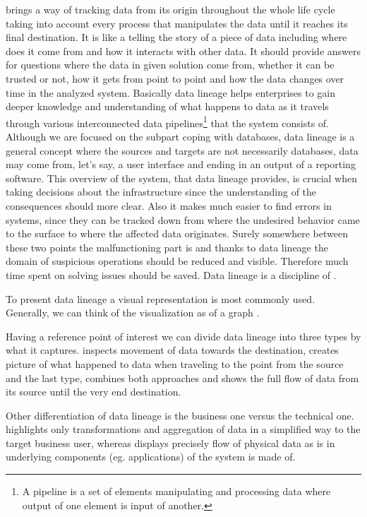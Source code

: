  brings a way of tracking data from its origin throughout the whole life cycle taking into account every process that manipulates the data until it reaches its final destination. It is like a telling the story of a piece of data including where does it come from and how it interacts with other data.
It should provide answers for questions where the data in given solution come from, whether it can be trusted or not, how it gets from point to point and how the data changes over time in the analyzed system.
Basically data lineage helps enterprises to gain deeper knowledge and understanding of what happens to data as it travels through various interconnected data pipelines\footnote{A pipeline is a set of elements manipulating and processing data where output of one element is input of another.} that the system consists of. Although we are focused on the subpart coping with databases, data lineage is a general concept where the sources and targets are not necessarily databases, data may come from, let's say, a user interface and ending in an output of a reporting software.
This overview of the system, that data lineage provides, is crucial when taking decisions about the infrastructure since the understanding of the consequences should more clear. Also it makes much easier to find errors in systems, since they can be tracked down from where the undesired behavior came to the surface to where the affected data originates. Surely somewhere between these two points the malfunctioning part is and thanks to data lineage the domain of suspicious operations should be reduced and visible. 
Therefore much time spent on solving issues should be saved.
Data lineage is a discipline of . 

To present data lineage a visual representation is most commonly used. Generally, we can think of the visualization as of a graph .

Having a reference point of interest we can divide data lineage into three types by what it captures.  inspects movement of data towards the destination,  creates picture of what happened to data when traveling to the point from the source and the last type,  combines both approaches and shows the full flow of data from its source until the very end destination.

Other differentiation of data lineage is the business one versus the technical one.
 highlights only transformations and aggregation of data in a simplified way to the target business user, whereas  displays precisely flow of physical data as is in underlying components (eg. applications) of the system is made of.

